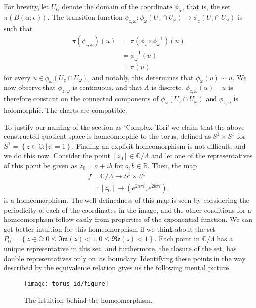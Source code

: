 For brevity, let $ U _{\alpha} $ denote the domain of the coordinate $ \phi
	_{\alpha} $, that is, the set $ \pi(B(\alpha; \epsilon)) $. The transition
function $ \phi _{z, \omega}: \phi _{\omega}(U_z \cap U _{\omega}) \to \phi
	_{z}( U_z \cap U _{\omega}) $ is such that
\begin{align*}
	\pi(\phi _{z,\omega})(u) & = \pi( \phi_z \circ \phi_{\omega}^{-1})(u) \\
	                         & = \phi_{\omega}^{-1}(u)                    \\
	                         & = \pi(u)
\end{align*}
for every $ u \in \phi _{\omega}(U_z \cap U _{\omega}) $, and notably, this
determines that $ \phi _{\omega}(u) \sim u $. We now observe that $ \phi _{z,
		\omega} $ is continuous, and that $ \Lambda $ is discrete. $ \phi _{z,
		\omega}(u)-u $ is therefore constant on the connected components of $ \phi
	_{\omega}(U_z \cap U _{\omega}) $ and $ \phi _{z, \omega} $ is holomorphic. The
charts are compatible.

To justify our naming of the section as `Complex Tori' we claim that the above
constructed quotient space is homeomorphic to the torus, defined as $ S^1 \times
	S^1$ for $ S^1 = \left\{ z \in \mathbb{C}: |z|=1 \right\} $. Finding an
explicit homeomorphism is not difficult, and we do this now. Consider the point
$ [z_0] \in \mathbb{C}/\Lambda $ and let one of the representatives of this
point be given as $ z_0 = a + ib $ for $ a,b \in \mathbb{R} $. Then, the map
\begin{align*}
	f & : \mathbb{C}/\Lambda \to S^1 \times S^1                       \\
	  & : [z_0] \mapsto \left( e ^{2 a\pi i}, e ^{2 b \pi i} \right).
\end{align*}
is a homeomorphism. The well-definedness of this map is seen by considering the
periodicity of each of the coordinates in the image, and the other conditions
for a homeomorphism follow easily from properties of the exponential function.
We can get better intuition for this homeomorphism if we think about the set $
	P_0 = \left\{ z \in \mathbb{C}: 0 \leq \mathfrak{Im}(z) < 1, 0 \leq
	\mathfrak{Re}(z) < 1\right\} $. Each point in $ \mathbb{C}/\Lambda $ has a
unique representative in this set, and furthermore, the closure of the set, has
double representatives only on its boundary. Identifying these points in the way
described by the equivalence relation gives us the following mental picture.

\begin{figure*}
	\centering
	\texttt{[image: torus-id/figure]}
	\caption{The intuition behind the homeomorphism.}
\end{figure*}

